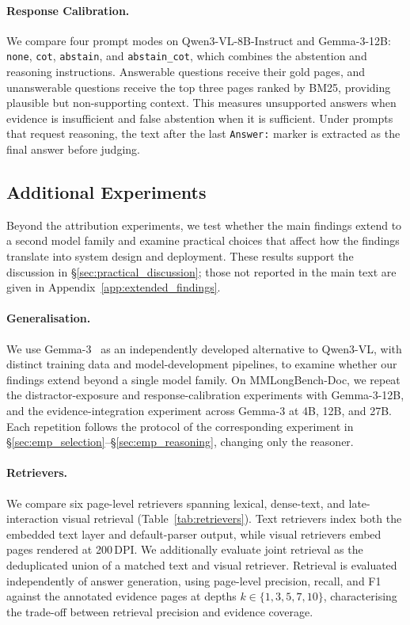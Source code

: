 \paragraph{Response Calibration.} We compare four prompt modes on Qwen3-VL-8B-Instruct and Gemma-3-12B: \texttt{none}, \texttt{cot}, \texttt{abstain}, and \texttt{abstain\_cot}, which combines the abstention and reasoning instructions. Answerable questions receive their gold pages, and unanswerable questions receive the top three pages ranked by BM25, providing plausible but non-supporting context. This measures unsupported answers when evidence is insufficient and false abstention when it is sufficient. Under prompts that request reasoning, the text after the last \texttt{Answer:} marker is extracted as the final answer before judging.

\subsection{Additional Experiments}
\label{sec:emp_additional}

Beyond the attribution experiments, we test whether the main findings extend to a second model family and examine practical choices that affect how the findings translate into system design and deployment. These results support the discussion in \S\ref{sec:practical_discussion}; those not reported in the main text are given in Appendix~\ref{app:extended_findings}.

\paragraph{Generalisation.} We use Gemma-3~\citep{team2025gemma} as an independently developed alternative to Qwen3-VL, with distinct training data and model-development pipelines, to examine whether our findings extend beyond a single model family. On MMLongBench-Doc, we repeat the distractor-exposure and response-calibration experiments with Gemma-3-12B, and the evidence-integration experiment across Gemma-3 at 4B, 12B, and 27B. Each repetition follows the protocol of the corresponding experiment in \S\ref{sec:emp_selection}--\S\ref{sec:emp_reasoning}, changing only the reasoner.

\paragraph{Retrievers.} We compare six page-level retrievers spanning lexical, dense-text, and late-interaction visual retrieval (Table~\ref{tab:retrievers}). Text retrievers index both the embedded text layer and default-parser output, while visual retrievers embed pages rendered at 200\,DPI. We additionally evaluate joint retrieval as the deduplicated union of a matched text and visual retriever. Retrieval is evaluated independently of answer generation, using page-level precision, recall, and F1 against the annotated evidence pages at depths $k \in \{1,3,5,7,10\}$, characterising the trade-off between retrieval precision and evidence coverage.

